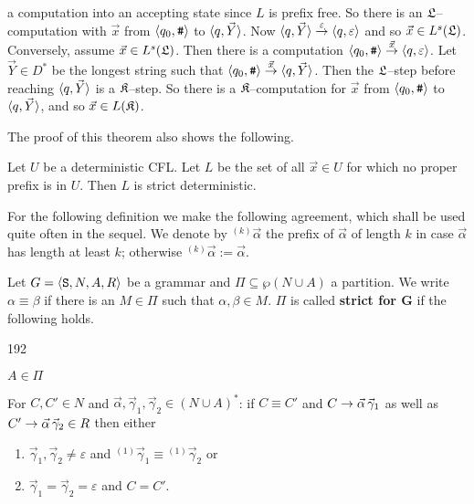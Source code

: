 a computation into an accepting state since $L$ is prefix
free. So there is an $\mathfrak{L}$--computation with $\vec{x}$ from
$\langle q_0, \mbox{\tt \#}\rangle$ to $\langle q, \vec{Y}\rangle$. Now 
$\langle q, \vec{Y}\rangle \stackrel{\varepsilon}{\rightarrow} \langle q, \varepsilon\rangle$
and so $\vec{x} \in L^s(\mathfrak{L})$. Conversely, assume
$\vec{x} \in L^s(\mathfrak{L})$. Then there is a computation
$\langle q_0, \mbox{\tt \#}\rangle \stackrel{\vec{x}}{\rightarrow}
\langle q, \varepsilon\rangle$. Let $\vec{Y} \in D^{\ast}$
be the longest string such that
$\langle q_0, \mbox{\tt \#}\rangle \stackrel{\vec{x}}{\rightarrow}
\langle q, \vec{Y}\rangle$. Then the $\mathfrak{L}$--step before reaching
$\langle q, \vec{Y}\rangle$ is a $\mathfrak{K}$--step. So there is a
$\mathfrak{K}$--computation for $\vec{x}$ from $\langle q_0, \mbox{\tt \#}\rangle$ to
$\langle q,\vec{Y}\rangle$, and so $\vec{x} \in L(\mathfrak{K})$.
\proofend

The proof of this theorem also shows the following.
\begin{thm}
\label{thm:prffrei}
Let $U$ be a deterministic CFL.
Let $L$ be the set of all $\vec{x} \in U$ for which
no proper prefix is in $U$. Then $L$ is strict
deterministic.
\end{thm}
For the following definition we make the following agreement,
which shall be used quite often in the sequel.
We denote by ${^{(k)}\vec{\alpha}}$ the prefix of $\vec{\alpha}$
of length $k$ in case $\vec{\alpha}$ has length at least
$k$; otherwise ${^{(k)}\vec{\alpha}} := \vec{\alpha}$.
\begin{defn}
\index{$\equiv$}%
Let $G = \langle \mbox{\tt S}, N, A, R\rangle$ be a grammar and
$\Pi \subseteq \wp(N \cup A)$ a partition. We write
$\alpha \equiv \beta$ if there is an $M \in \Pi$ such that
$\alpha, \beta \in M$. $\Pi$ is called \textbf{strict for G}
if the following holds.
\begin{dingautolist}{192}
\item
    $A \in \Pi$
\item
    For $C, C' \in N$ and $\vec{\alpha}, \vec{\gamma}_1,
    \vec{\gamma}_2 \in (N \cup A)^{\ast}$: if $C \equiv C'$
    and $C \rightarrow \vec{\alpha}\, \vec{\gamma}_1$ as well as
    $C' \rightarrow \vec{\alpha}\, \vec{\gamma}_2 \in R$ then either
        \begin{enumerate}
        \item
            $\vec{\gamma}_1, \vec{\gamma}_2 \neq \varepsilon$ and
            ${^{(1)}\vec{\gamma}_1} \equiv {^{(1)}\vec{\gamma}_2}$
            or
        \item
            $\vec{\gamma}_1 = \vec{\gamma}_2 = \varepsilon$ and
            $C = C'$.
        \end{enumerate}
\end{dingautolist}
\end{defn}

